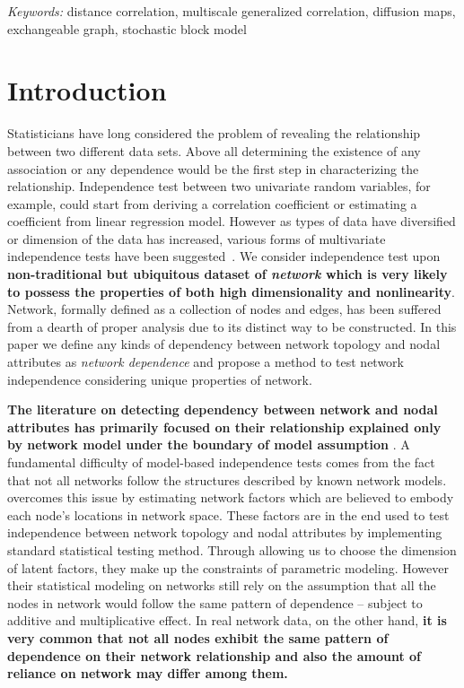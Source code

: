 \documentclass[12pt]{article}
\theoremstyle{definition}
\begin{document}
	\noindent%
	{\it Keywords:} distance correlation, multiscale generalized correlation, diffusion maps, exchangeable graph, stochastic block model 
	\vfill
	
	\newpage
	\section{Introduction}
	\label{sec:intro}

Statisticians have long considered the problem of revealing the relationship between two different data sets. Above all determining the existence of any association or any dependence would be the first step in characterizing the relationship. Independence test between two univariate random variables, for example, could start from deriving a correlation coefficient or estimating a coefficient from linear regression model. However as types of data have diversified or dimension of the data has increased, various forms of multivariate independence tests have been suggested~\citep{heller2012consistent, szekely2007measuring}. We consider independence test upon \textbf{non-traditional but ubiquitous dataset of \textit{network} which is very likely to possess the properties of both high dimensionality and nonlinearity}. Network, formally defined as a collection of nodes and edges, has been suffered from a dearth of proper analysis due to its distinct way to be constructed. In this paper we define any kinds of dependency between network topology and nodal attributes as \textit{network dependence} and propose a method to test network independence considering unique properties of network. 

\textbf{The literature on detecting dependency between network and nodal attributes has primarily focused on their relationship explained only by network model under the boundary of model assumption} \citep{wasserman1996logit, howard2016understanding, christakis2007spread, christakis2008collective}. A fundamental difficulty of model-based independence tests comes from the fact that not all networks follow the structures described by known network models. \cite{fosdick2015testing} overcomes this issue by estimating network factors which are believed to embody each node's locations in network space. These factors are in the end used to test independence between network topology and nodal attributes by implementing standard statistical testing method. Through allowing us to choose the dimension of latent factors, they make up the constraints of parametric modeling. However their statistical modeling on networks still rely on the assumption that all the nodes in network would follow the same pattern of dependence -- subject to additive and multiplicative effect. In real network data, on the other hand, \textbf{it is very common that not all nodes exhibit the same pattern of dependence on their network relationship and also the amount of reliance on network may differ among them.}
\end{document}
